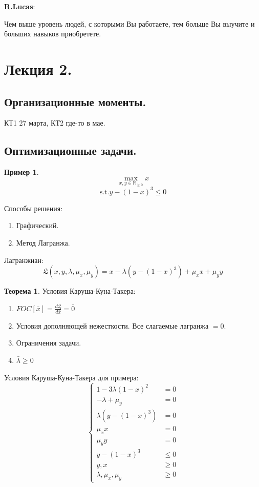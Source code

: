 \documentclass[reqno]{article}
\theoremstyle{definition}
\theoremstyle{definition}
\theoremstyle{definition}
\newtheorem*{exmp}{Пример}
\theoremstyle{definition}
\theoremstyle{definition}
\theoremstyle{definition}
\newtheorem{thm}{Теорема}[section]
\theoremstyle{definition}
\theoremstyle{definition}
\theoremstyle{definition}
\begin{document}
	\textbf{R.Lucas}: 
	
	Чем выше уровень людей, с которыми Вы работаете, тем больше Вы выучите и больших навыков приобретете.
	
	
	\newpage
	
	\section{Лекция 2.}
	
	\subsection{Организационные моменты.}
	
	КТ1 27 марта, КТ2 где-то в мае.
	
	\subsection{Оптимизационные задачи.}
	
	\begin{exmp}
		$$\max_{x,y \in\mathds{R}_{\geq 0}} x$$
		$$\text{s.t.} y - (1 - x)^3 \leq 0$$
	\end{exmp}
	
	Способы решения:
	\begin{enumerate}
		\item Графический.
		\item Метод Лагранжа.
	\end{enumerate}
	
	Лагранжиан:
	$$\mathfrak{L}(x, y, \lambda, \mu_x, \mu_y) = x - \lambda(y - (1 - x)^3) + \mu_xx + \mu_yy$$
	
	\begin{thm}
		Условия Каруша-Куна-Такера:
		\begin{enumerate}
			\item $FOC[\bar{x}] = \frac{d\mathfrak{L}}{d\bar{x}} = \bar{0}$
			\item Условия дополняющей нежесткости. Все слагаемые лагранжа $= 0$.
			\item Ограничения задачи.
			\item $\bar{\lambda} \geq 0$
		\end{enumerate}
	\end{thm}
	
	Условия Каруша-Куна-Такера для примера:
	\begin{equation}
		\begin{cases}
			1 - 3\lambda(1 - x)^2 & = 0\\
			-\lambda + \mu_y& = 0\\
			\lambda(y - (1 - x)^3)& = 0\\
			\mu_xx & = 0\\
			\mu_yy & = 0\\
			y - (1-x)^3 &\leq 0\\
			y, x &\geq 0\\
			\lambda, \mu_x, \mu_y &\geq 0
		\end{cases}
	\end{equation}
	
\end{document}
